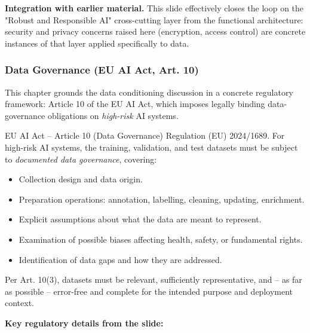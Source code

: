 \textbf{Integration with earlier material.} This slide effectively closes the loop on the "Robust and Responsible AI" cross-cutting layer from the functional architecture: security and privacy concerns raised here (encryption, access control) are concrete instances of that layer applied specifically to data.

\subsubsection{ Data Governance (EU AI Act, Art. 10)}

This chapter grounds the data conditioning discussion in a concrete regulatory framework: Article 10 of the EU AI Act, which imposes legally binding data-governance obligations on \emph{high-risk} AI systems.

\begin{defbox}{EU AI Act -- Article 10 (Data Governance)}
Regulation (EU) 2024/1689. For high-risk AI systems, the training, validation, and test datasets must be subject to \emph{documented data governance}, covering:
\begin{itemize}
    \item Collection design and data origin.
    \item Preparation operations: annotation, labelling, cleaning, updating, enrichment.
    \item Explicit assumptions about what the data are meant to represent.
    \item Examination of possible biases affecting health, safety, or fundamental rights.
    \item Identification of data gaps and how they are addressed.
\end{itemize}
Per Art. 10(3), datasets must be relevant, sufficiently representative, and -- as far as possible -- error-free and complete for the intended purpose and deployment context.
\end{defbox}

\textbf{Key regulatory details from the slide:}

